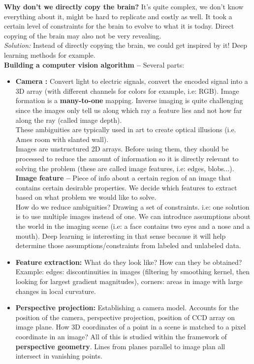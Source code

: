 \documentclass[a4paper,11pt]{article}
\begin{document}
\textbf{Why don't we directly copy the brain?} It's quite complex, we don't know everything about it, might be hard to replicate and costly as well. It took a certain level of constraints for the brain to evolve to what it is today. Direct copying of the brain may also not be very revealing.\\
\textit{Solution:} Instead of directly copying the brain, we could get inspired by it! Deep learning methods for example.\vspace{5pt}\\
\textbf{Building a computer vision algorithm --} Several parts:
\begin{itemize}
	\item \textbf{Camera :} Convert light to electric signals, convert the encoded signal into a 3D array (with different channels for colors for example, i.e: RGB). Image formation is a \textbf{many-to-one} mapping. Inverse imaging is quite challenging since the images only tell us along which ray a feature lies and not how far along the ray (called image depth).\\
	These ambiguities are typically used in art to create optical illusions (i.e. Ames room with slanted wall).\\
	Images are unstructured 2D arrays. Before using them, they should be processed to reduce the amount of information so it is directly relevant to solving the problem (these are called image features, i.e: edges, blobs...).\\
	\textbf{Image feature --} Piece of info about a certain region of an image that contains certain desirable properties. We decide which features to extract based on what problem we would like to solve.\\
	How do we reduce ambiguities? Drawing a set of constraints. i.e: one solution is to use multiple images instead of one. We can introduce assumptions about the world in the imaging scene (i.e: a face contains two eyes and a nose and a mouth). Deep learning is interesting in that sense because it will help determine those assumptions/constraints from labeled and unlabeled data.
	\item \textbf{Feature extraction:} What do they look like? How can they be obtained? Example: edges: discontinuities in images (filtering by smoothing kernel, then looking for largest gradient magnitudes), corners: areas in image with large changes in local curvature.
	\item \textbf{Perspective projection:} Establishing a camera model. Accounts for the position of the camera, perspective projection, position of CCD array on image plane. How 3D coordinates of a point in a scene is matched to a pixel coordinate in an image? All of this is studied within the framework of \textbf{perspective geometry}. Lines from planes parallel to image plan all intersect in vanishing points.
\end{itemize}
\end{document}

